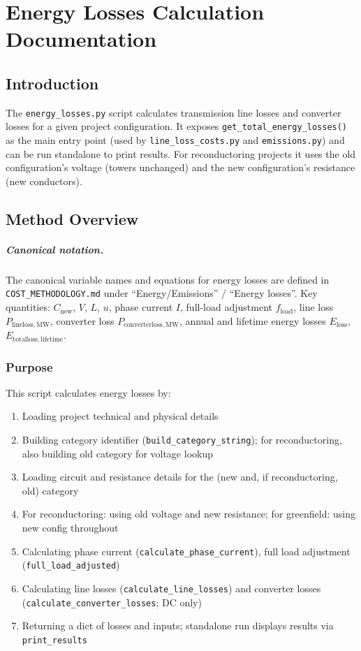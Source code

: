 \documentclass[ctcc_full_documentation.tex]{subfiles}
\begin{document}
\chapter{Energy Losses Calculation Documentation}

\section{Introduction}

The \texttt{energy\_losses.py} script calculates transmission line losses and converter losses for a given project configuration. It exposes \texttt{get\_total\_energy\_losses()} as the main entry point (used by \texttt{line\_loss\_costs.py} and \texttt{emissions.py}) and can be run standalone to print results. For reconductoring projects it uses the old configuration's voltage (towers unchanged) and the new configuration's resistance (new conductors).

\section{Method Overview}

\paragraph{Canonical notation.}
The canonical variable names and equations for energy losses are defined in \texttt{COST\_METHODOLOGY.md} under ``Energy/Emissions'' / ``Energy losses''. Key quantities: $C_{\mathrm{new}}$, $V$, $L$, $u$, phase current $I$, full-load adjustment $f_{\mathrm{load}}$, line loss $P_{\mathrm{lineloss,MW}}$, converter loss $P_{\mathrm{converterloss,MW}}$, annual and lifetime energy losses $E_{\mathrm{loss}}$, $E_{\mathrm{totalloss,lifetime}}$.

\subsection{Purpose}

This script calculates energy losses by:
\begin{enumerate}
    \item Loading project technical and physical details
    \item Building category identifier (\texttt{build\_category\_string}); for reconductoring, also building old category for voltage lookup
    \item Loading circuit and resistance details for the (new and, if reconductoring, old) category
    \item For reconductoring: using old voltage and new resistance; for greenfield: using new config throughout
    \item Calculating phase current (\texttt{calculate\_phase\_current}), full load adjustment (\texttt{full\_load\_adjusted})
    \item Calculating line losses (\texttt{calculate\_line\_losses}) and converter losses (\texttt{calculate\_converter\_losses}; DC only)
    \item Returning a dict of losses and inputs; standalone run displays results via \texttt{print\_results}
\end{enumerate}
\end{document}
